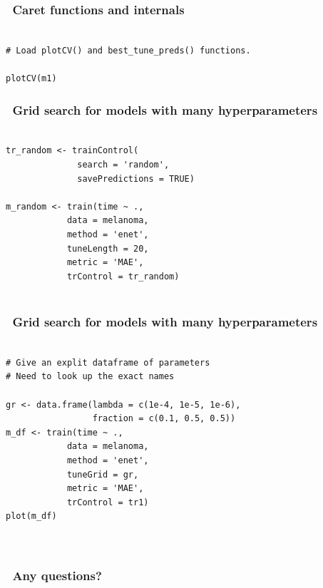 \documentclass[handout, aspectratio = 169]{beamer}
\begin{document}
\begin{frame}[fragile]
\frametitle{\insertframenumber~Caret functions and internals}
\begin{Verbatim}

# Load plotCV() and best_tune_preds() functions.

plotCV(m1) 

\end{Verbatim}

\end{frame} 




\begin{frame}[fragile]
\frametitle{\insertframenumber~Grid search for models with many hyperparameters}
\begin{Verbatim}

tr_random <- trainControl(
              search = 'random',
              savePredictions = TRUE)

m_random <- train(time ~ ., 
            data = melanoma,
            method = 'enet',
            tuneLength = 20,
            metric = 'MAE',
            trControl = tr_random)
            
\end{Verbatim}

\end{frame} 




\begin{frame}[fragile]
\frametitle{\insertframenumber~Grid search for models with many hyperparameters}
\begin{Verbatim}

# Give an explit dataframe of parameters
# Need to look up the exact names 

gr <- data.frame(lambda = c(1e-4, 1e-5, 1e-6),
                 fraction = c(0.1, 0.5, 0.5))
m_df <- train(time ~ ., 
            data = melanoma,
            method = 'enet',
            tuneGrid = gr,
            metric = 'MAE',
            trControl = tr1)
plot(m_df)

            
\end{Verbatim}

\end{frame} 



\begin{frame}
\frametitle{\insertframenumber~Any questions?}


\end{frame} 
\end{document}

